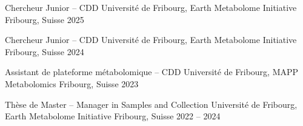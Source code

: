 

\begin{cventries}


\cventry
  {Chercheur Junior – CDD} %
  {Université de Fribourg, Earth Metabolome Initiative} %
  {Fribourg, Suisse} %
  {2025} %
  {}

\cventry
  {Chercheur Junior – CDD} %
  {Université de Fribourg, Earth Metabolome Initiative} %
  {Fribourg, Suisse} %
  {2024} %
  {}

\cventry
  {Assistant de plateforme métabolomique – CDD} %
  {Université de Fribourg, MAPP Metabolomics} %
  {Fribourg, Suisse} %
  {2023} %
  {}

\cventry
  {Thèse de Master – Manager in Samples and Collection} %
  {Université de Fribourg, Earth Metabolome Initiative} %
  {Fribourg, Suisse} %
  {2022 -- 2024} %
  {}


\end{cventries}
